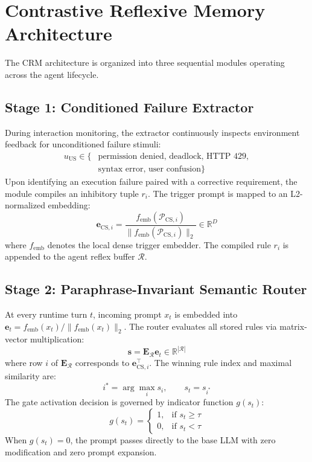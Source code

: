 \documentclass[10pt,conference]{IEEEtran}
\begin{document}
\section{Contrastive Reflexive Memory Architecture}

The CRM architecture is organized into three sequential modules operating across the agent lifecycle.

\subsection{Stage 1: Conditioned Failure Extractor}
During interaction monitoring, the extractor continuously inspects environment feedback for unconditioned failure stimuli:
\begin{equation}
\begin{aligned}
    u_{\text{US}} \in \{ & \text{permission denied},\, \text{deadlock},\, \text{HTTP 429}, \\
    & \text{syntax error},\, \text{user confusion} \}
\end{aligned}
\end{equation}
Upon identifying an execution failure paired with a corrective requirement, the module compiles an inhibitory tuple $r_i$. The trigger prompt is mapped to an L2-normalized embedding:
\begin{equation}
    \mathbf{e}_{\text{CS}, i} = \frac{f_{\text{emb}}(\mathcal{P}_{\text{CS}, i})}{\|f_{\text{emb}}(\mathcal{P}_{\text{CS}, i})\|_2} \in \mathbb{R}^D
\end{equation}
where $f_{\text{emb}}$ denotes the local dense trigger embedder. The compiled rule $r_i$ is appended to the agent reflex buffer $\mathcal{R}$.

\subsection{Stage 2: Paraphrase-Invariant Semantic Router}
At every runtime turn $t$, incoming prompt $x_t$ is embedded into $\mathbf{e}_t = f_{\text{emb}}(x_t) / \|f_{\text{emb}}(x_t)\|_2$. The router evaluates all stored rules via matrix-vector multiplication:
\begin{equation}
    \mathbf{s} = \mathbf{E}_{\mathcal{R}} \mathbf{e}_t \in \mathbb{R}^{|\mathcal{R}|}
\end{equation}
where row $i$ of $\mathbf{E}_{\mathcal{R}}$ corresponds to $\mathbf{e}_{\text{CS}, i}^\top$. The winning rule index and maximal similarity are:
\begin{equation}
    i^* = \arg\max_{i} s_i, \qquad s_t = s_{i^*}
\end{equation}
The gate activation decision is governed by indicator function $g(s_t)$:
\begin{equation}
    g(s_t) = \begin{cases}
        1, & \text{if } s_t \ge \tau \\
        0, & \text{if } s_t < \tau
    \end{cases}
\end{equation}
When $g(s_t) = 0$, the prompt passes directly to the base LLM with zero modification and zero prompt expansion.
\end{document}
